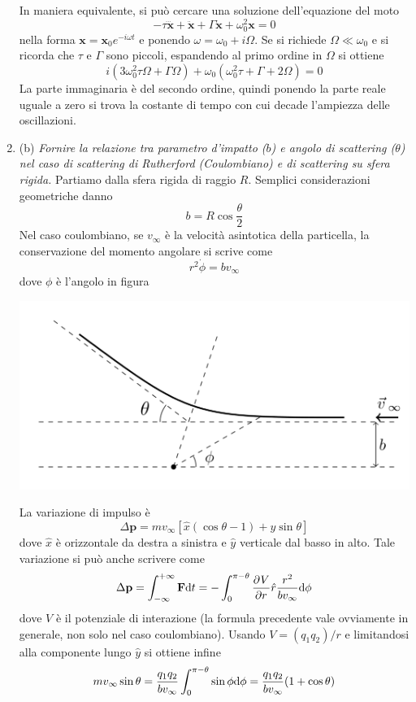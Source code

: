 \documentclass{article}
\renewcommand{\b}{(b)}
\renewcommand{\t}[1]{\textit{ #1}}
\renewcommand{\vec}[1]{\mathbf{#1}}
\begin{document}
\begin{enumerate}
\noindent In maniera equivalente, si può cercare una soluzione dell'equazione del moto
\[-\tau\dddot{\vec{x}}+\ddot{\vec{x}}+\Gamma\dot{\vec{x}}+\omega_0^2\vec{x}=0\]
nella forma $\vec{x}=\vec{x}_0e^{-i\omega t}$ e ponendo $\omega=\omega_0+i\Omega$. Se si richiede $\Omega\ll\omega_0$ e si ricorda che $\tau$ e $\Gamma$ sono piccoli, espandendo al primo ordine in $\Omega$ si ottiene
\[i(3\omega_0^2\tau\Omega+\Gamma\Omega)+\omega_0(\omega_0^2\tau+\Gamma+2\Omega)=0\]
La parte immaginaria è del secondo ordine, quindi ponendo la parte reale uguale a zero si trova la costante di tempo con cui decade l'ampiezza delle oscillazioni.
\item\b\t{Fornire la relazione tra parametro d'impatto ($b$) e angolo di scattering ($\theta$) nel caso
	di scattering di Rutherford (Coulombiano) e di scattering su sfera rigida.} Partiamo dalla sfera rigida di raggio $R$. Semplici considerazioni geometriche danno
\[b=R\cos\frac{\theta}{2}\]
Nel caso coulombiano, se $v_\infty$ è la velocità asintotica della particella, la conservazione del momento angolare si scrive come
\[r^2\dot{\phi}=bv_\infty\]
dove $\phi$ è l'angolo in figura
\begin{center}
	\includegraphics[scale=.4]{rutherford.png}
\end{center}
La variazione di impulso è
\[\Delta\vec{p}=mv_\infty[\hat{x}(\cos\theta-1)+\hat{y}\sin\theta]\]
dove $\hat{x}$ è orizzontale da destra a sinistra e $\hat{y}$ verticale dal basso in alto. Tale variazione si può anche scrivere come
\[\Delta\vec{p}=\int_{-\infty}^{+\infty}\vec{F}\d t=-\int_{0}^{\pi-\theta}\pder{V}{r}\hat{r}\frac{r^2}{b v_\infty}\d \phi\]
dove $V$ è il potenziale di interazione (la formula precedente vale ovviamente in generale, non solo nel caso coulombiano). Usando $V=(q_1q_2)/r$ e limitandosi alla componente lungo $\hat{y}$ si ottiene infine
\[mv_\infty\sin\theta=\frac{q_1q_2}{bv_\infty}\int_{0}^{\pi-\theta}\sin\phi\mathrm{d} \phi=\frac{q_1q_2}{bv_\infty}(1+\cos\theta)\]

\end{enumerate}
\end{document}
